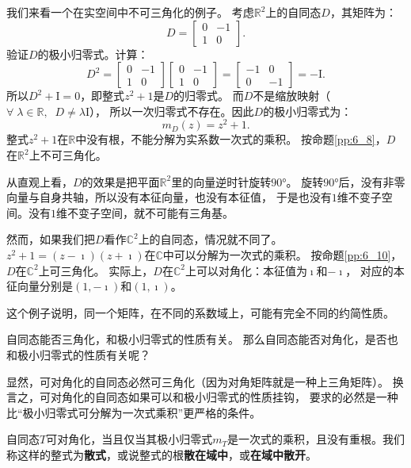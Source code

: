 \documentclass[12pt,UTF8,fontset=none]{ctexbook}
\begin{document}
我们来看一个在实空间中不可三角化的例子。
考虑$\mathbb{R}^2$上的自同态$D$，其矩阵为：
$$
D = \begin{bmatrix} 0 & -1 \\ 1 & 0 \end{bmatrix}.
$$
验证$D$的极小归零式。计算：
$$
D^2 = \begin{bmatrix} 0 & -1 \\ 1 & 0 \end{bmatrix}\begin{bmatrix} 0 & -1 \\ 1 & 0 \end{bmatrix} = \begin{bmatrix} -1 & 0 \\ 0 & -1 \end{bmatrix} = -\mathrm{I}.
$$
所以$D^2 + \mathrm{I} = 0$，即整式$z^2 + 1$是$D$的归零式。
而$D$不是缩放映射（$\forall\;\lambda \in \mathbb{R},\;\;D \neq \lambda \mathrm{I}$），
所以一次归零式不存在。因此$D$的极小归零式为：
$$
m_D(z) = z^2 + 1.
$$
整式$z^2 + 1$在$\mathbb{R}$中没有根，不能分解为实系数一次式的乘积。
按命题\ref{pp:6_8}，$D$在$\mathbb{R}^2$上不可三角化。

从直观上看，$D$的效果是把平面$\mathbb{R}^2$里的向量逆时针旋转$90°$。
旋转$90°$后，没有非零向量与自身共轴，所以没有本征向量，也没有本征值，
于是也没有$1$维不变子空间。没有$1$维不变子空间，就不可能有三角基。

然而，如果我们把$D$看作$\mathbb{C}^2$上的自同态，情况就不同了。
$z^2 + 1 = (z - \imath)(z + \imath)$在$\mathbb{C}$中可以分解为一次式的乘积。
按命题\ref{pp:6_10}，$D$在$\mathbb{C}^2$上可三角化。
实际上，$D$在$\mathbb{C}^2$上可以对角化：本征值为$\imath$和$-\imath$，
对应的本征向量分别是$(1, -\imath)$和$(1, \imath)$。

这个例子说明，同一个矩阵，在不同的系数域上，可能有完全不同的约简性质。

自同态能否三角化，和极小归零式的性质有关。
那么自同态能否对角化，是否也和极小归零式的性质有关呢？

显然，可对角化的自同态必然可三角化（因为对角矩阵就是一种上三角矩阵）。
换言之，可对角化的自同态如果可以和极小归零式的性质挂钩，
要求的必然是一种比“极小归零式可分解为一次式乘积”更严格的条件。

\begin{pp}\label{pp:6_11}
    自同态$T$可对角化，当且仅当其极小归零式$m_T$是一次式的乘积，且没有重根。我们称这样的整式为\textbf{散式}，或说整式的根\textbf{散在域中}，或\textbf{在域中散开}。
\end{pp}
\end{document}
